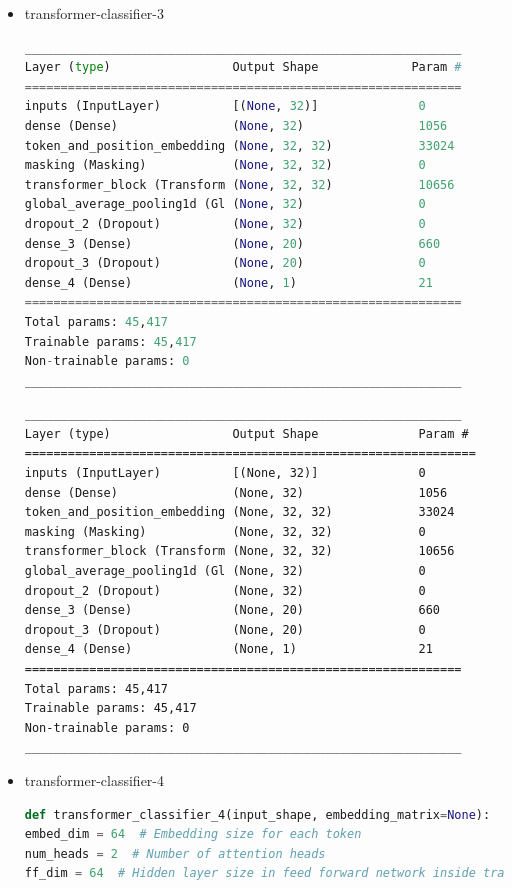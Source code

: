 \documentclass{article}
\begin{document}
\begin{itemize}
\item transformer-classifier-3

\begin{lstlisting}[language=Python, caption=Дефиниция на transformer-classifier-3.]
_____________________________________________________________
Layer (type)                 Output Shape             Param #
=============================================================
inputs (InputLayer)          [(None, 32)]              0
dense (Dense)                (None, 32)                1056
token_and_position_embedding (None, 32, 32)            33024
masking (Masking)            (None, 32, 32)            0
transformer_block (Transform (None, 32, 32)            10656
global_average_pooling1d (Gl (None, 32)                0
dropout_2 (Dropout)          (None, 32)                0
dense_3 (Dense)              (None, 20)                660
dropout_3 (Dropout)          (None, 20)                0
dense_4 (Dense)              (None, 1)                 21
=============================================================
Total params: 45,417
Trainable params: 45,417
Non-trainable params: 0
_____________________________________________________________
\end{lstlisting}

\begin{lstlisting}[numbers=none, caption=Обобщение на transformer-classifier-3.]
_____________________________________________________________
Layer (type)                 Output Shape              Param #
===============================================================
inputs (InputLayer)          [(None, 32)]              0
dense (Dense)                (None, 32)                1056
token_and_position_embedding (None, 32, 32)            33024
masking (Masking)            (None, 32, 32)            0
transformer_block (Transform (None, 32, 32)            10656
global_average_pooling1d (Gl (None, 32)                0
dropout_2 (Dropout)          (None, 32)                0
dense_3 (Dense)              (None, 20)                660
dropout_3 (Dropout)          (None, 20)                0
dense_4 (Dense)              (None, 1)                 21
=============================================================
Total params: 45,417
Trainable params: 45,417
Non-trainable params: 0
_____________________________________________________________
\end{lstlisting}

\item transformer-classifier-4

\begin{lstlisting}[language=Python, caption=Дефиниция на transformer-classifier-4.]
def transformer_classifier_4(input_shape, embedding_matrix=None):
embed_dim = 64  # Embedding size for each token
num_heads = 2  # Number of attention heads
ff_dim = 64  # Hidden layer size in feed forward network inside transformer


\end{lstlisting}
\end{itemize}
\end{document}
